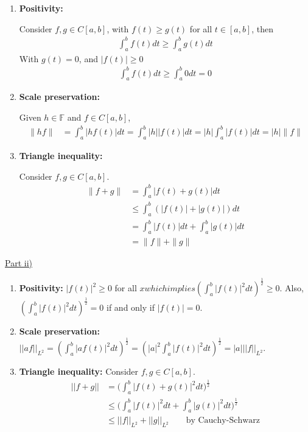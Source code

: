 \documentclass[letterpaper,12pt]{article}
\begin{document}
\begin{enumerate}
  \item \textbf{Positivity:}
  
        Consider $f, g \in C[a, b]$, with $f(t) \geq g(t)$ for all $t \in [a, b]$, then
        \begin{align*}
          \int_a^b f(t)dt \geq \int_a^b g(t)dt 
        \end{align*}
        With $g(t) = 0$, and $|f(t)| \geq 0$
        \begin{align*}
          \int_a^b f(t)dt \geq \int_a^b 0 dt = 0
        \end{align*}
  \item \textbf{Scale preservation:}
  
        Given $h \in \mathbb F$ and $f \in C[a, b]$,
        \begin{align*}
          \| hf \| &= \int_a^b |h f(t)| dt = \int_a^b |h||f(t)| dt =
          |h| \int_a^b |f(t)| dt = |h| \|f\|
        \end{align*}
  \item \textbf{Triangle inequality:}
        
        Consider $f, g \in C[a, b]$.
        \begin{align*}
          \| f + g \| &= \int_a^b |f(t) + g(t)| dt \\
          &\leq \int_a^b (|f(t)| + |g(t)|) dt \\
          &= \int_a^b |f(t)|dt + \int_a^b |g(t)|dt \\
          &= \|f\| + \|g\| 
        \end{align*}
\end{enumerate}

\underline{Part ii)}

\begin{enumerate}
	\item \textbf{Positivity: } $|f(t)|^2 \geq 0$ for all $x which implies (\int_a^b |f(t)|^2dt)^\frac{1}{2} \geq 0$. Also, $(\int_a^b |f(t)|^2 dt)^\frac{1}{2} = 0$ if and only if $|f(t)| = 0$.
	\item \textbf{Scale preservation: }$||af||_{L^2} = (\int_a^b |af(t)|^2 dt)^\frac{1}{2} = (|a|^2 \int_a^b |f(t)|^2 dt)^\frac{1}{2} = |a| ||f||_{L^2}$.
	\item \textbf{Triangle inequality: } Consider $f, g \in C[a, b]$.
		\begin{align*}
		|| f + g || &= \Big(\int_a^b |f(t) + g(t)|^2 dt\Big)^\frac{1}{2} \\
		&\leq \Big(\int_a^b |f(t)|^2dt + \int_a^b |g(t)|^2dt\Big)^\frac{1}{2} \\
		&\leq ||f||_{L^2} + ||g||_{L^2} \quad \quad \text{by Cauchy-Schwarz}
		\end{align*}
\end{enumerate}
\end{document}
